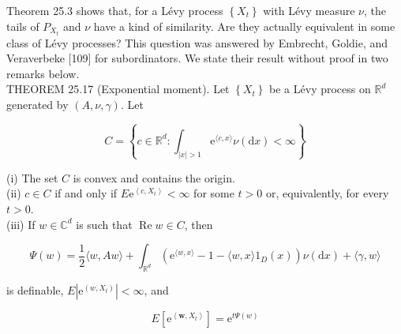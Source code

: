 \documentclass[a4paper,11pt]{article}
\begin{document}
Theorem 25.3 shows that, for a Lévy process $\left\{X_{t}\right\}$ with Lévy measure $\nu$,
the tails of $P_{X_{t}}$ and $\nu$ have a kind of similarity. Are they actually equivalent
in some class of Lévy processes? This question was answered by Embrecht, Goldie, and Veraverbeke [109]
for subordinators. We state their result without proof in two remarks below. \\


THEOREM 25.17 (Exponential moment). Let $\left\{X_{t}\right\}$ be a Lévy process on $\mathbb{R}^{d}$
generated by $(A, \nu, \gamma)$. Let

$$
    C=\left\{c \in \mathbb{R}^{d}: \int_{|x|>1} \mathrm{e}^{\langle c, x\rangle} \nu(\mathrm{d} x)<\infty\right\}
$$

(i) The set $C$ is convex and contains the origin. \\

(ii) $c \in C$ if and only if $E \mathrm{e}^{\left\langle c, X_{t}\right\rangle}<\infty$ for some $t>0$ or,
equivalently, for every $t>0$.\\

(iii) If $w \in \mathbb{C}^{d}$ is such that $\operatorname{Re} w \in C$, then


\begin{equation*}
    \Psi(w)=\frac{1}{2}\langle w, A w\rangle+\int_{\mathbb{R}^{d}}\left(\mathrm{e}^{\langle w, x\rangle}-1-\langle w, x\rangle 1_{D}(x)\right) \nu(\mathrm{d} x)+\langle\gamma, w\rangle \tag{25.11}
\end{equation*}


is definable, $E\left|\mathrm{e}^{\left(w, X_{t}\right)}\right|<\infty$, and


\begin{equation*}
    E\left[\mathrm{e}^{\left\langle\boldsymbol{w}, X_{t}\right\rangle}\right]=\mathrm{e}^{t \Psi(w)} \tag{25.12}
\end{equation*}
\end{document}

